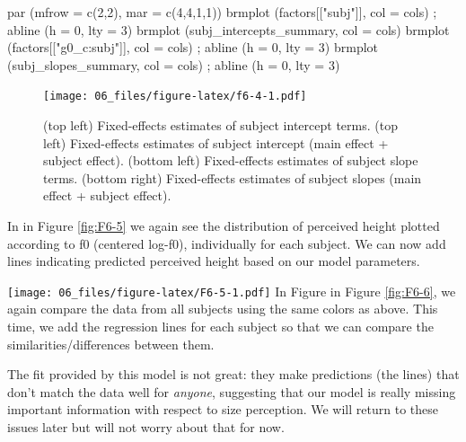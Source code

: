 \documentclass[
]{book}
\newenvironment{Shaded}{\begin{snugshade}}{\end{snugshade}}
\newcommand{\AttributeTok}[1]{\textcolor[rgb]{0.77,0.63,0.00}{#1}}
\newcommand{\DecValTok}[1]{\textcolor[rgb]{0.00,0.00,0.81}{#1}}
\newcommand{\FunctionTok}[1]{\textcolor[rgb]{0.00,0.00,0.00}{#1}}
\newcommand{\NormalTok}[1]{#1}
\newcommand{\StringTok}[1]{\textcolor[rgb]{0.31,0.60,0.02}{#1}}
\begin{document}
\begin{Shaded}
\begin{Highlighting}[]
\FunctionTok{par}\NormalTok{ (}\AttributeTok{mfrow =} \FunctionTok{c}\NormalTok{(}\DecValTok{2}\NormalTok{,}\DecValTok{2}\NormalTok{), }\AttributeTok{mar =} \FunctionTok{c}\NormalTok{(}\DecValTok{4}\NormalTok{,}\DecValTok{4}\NormalTok{,}\DecValTok{1}\NormalTok{,}\DecValTok{1}\NormalTok{))}
\FunctionTok{brmplot}\NormalTok{ (factors[[}\StringTok{"subj"}\NormalTok{]], }\AttributeTok{col =}\NormalTok{ cols) ; }\FunctionTok{abline}\NormalTok{ (}\AttributeTok{h =} \DecValTok{0}\NormalTok{, }\AttributeTok{lty =} \DecValTok{3}\NormalTok{)}
\FunctionTok{brmplot}\NormalTok{ (subj\_intercepts\_summary, }\AttributeTok{col =}\NormalTok{ cols)}
\FunctionTok{brmplot}\NormalTok{ (factors[[}\StringTok{"g0\_c:subj"}\NormalTok{]], }\AttributeTok{col =}\NormalTok{ cols) ; }\FunctionTok{abline}\NormalTok{ (}\AttributeTok{h =} \DecValTok{0}\NormalTok{, }\AttributeTok{lty =} \DecValTok{3}\NormalTok{)}
\FunctionTok{brmplot}\NormalTok{ (subj\_slopes\_summary, }\AttributeTok{col =}\NormalTok{ cols) ; }\FunctionTok{abline}\NormalTok{ (}\AttributeTok{h =} \DecValTok{0}\NormalTok{, }\AttributeTok{lty =} \DecValTok{3}\NormalTok{)}
\end{Highlighting}
\end{Shaded}

\begin{figure}
\centering
\texttt{[image: 06\_files/figure-latex/f6-4-1.pdf]}
\caption{\label{fig:f6-4}(top left) Fixed-effects estimates of subject intercept terms. (top left) Fixed-effects estimates of subject intercept (main effect + subject effect). (bottom left) Fixed-effects estimates of subject slope terms. (bottom right) Fixed-effects estimates of subject slopes (main effect + subject effect).}
\end{figure}

In in Figure \ref{fig:F6-5} we again see the distribution of perceived height plotted according to f0 (centered log-f0), individually for each subject. We can now add lines indicating predicted perceived height based on our model parameters.

\texttt{[image: 06\_files/figure-latex/F6-5-1.pdf]}
In Figure in Figure \ref{fig:F6-6}, we again compare the data from all subjects using the same colors as above. This time, we add the regression lines for each subject so that we can compare the similarities/differences between them.

The fit provided by this model is not great: they make predictions (the lines) that don't match the data well for \emph{anyone}, suggesting that our model is really missing important information with respect to size perception. We will return to these issues later but will not worry about that for now.
\end{document}
